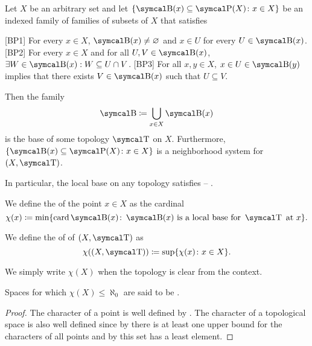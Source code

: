 \begin{proposition}\label{thm:topological_local_base_axioms}\cite[13]{Engelking1989}
  Let \( X \) be an arbitrary set and let \( \{ \CB(x) \subseteq \Power(X) \colon x \in X \} \) be an indexed family of families of subsets of \( X \) that satisfies
  \begin{description}
    [BP1] For every \( x \in X \), \( \CB(x) \neq \varnothing \) and \( x \in U \) for every \( U \in \CB(x) \).
    [BP2] For every \( x \in X \) and for all \( U, V \in \CB(x) \), \( \exists W \in \CB(x): W \subseteq U \cap V \).
    [BP3] For all \( x, y \in X \), \( x \in U \in \CB(y) \) implies that there exists \( V \in \CB(x) \) such that \( U \subseteq V \).
  \end{description}

  Then the family
  \begin{equation*}
    \CB \coloneqq \bigcup_{x \in X} \CB(x)
  \end{equation*}
  is the base of some topology \( \CT \) on \( X \). Furthermore, \( \{ \CB(x) \subseteq \Power(X) \colon x \in X \} \) is a neighborhood system for \( (X, \CT) \).

  In particular, the local base on any topology satisfies  -- .
\end{proposition}

\begin{definition}\label{def:topological_space_character}
  We define the  of the point \( x \in X \) as the cardinal
  \begin{equation*}
    \chi(x) \coloneqq \min \{ \Card \CB(x) \colon \CB(x) \text{ is a local base for } \CT \text{ at } x \}.
  \end{equation*}

  We define the  of of \( (X, \CT) \) as
  \begin{equation*}
    \chi((X, \CT)) \coloneqq \sup \{ \chi(x) \colon x \in X \}.
  \end{equation*}

  We simply write \( \chi(X) \) when the topology is clear from the context.

  Spaces for which \( \chi(X) \leq \aleph_0 \) are said to be .
\end{definition}
\begin{proof}
  The character of a point is well defined by . The character of a topological space is also well defined since by  there is at least one upper bound for the characters of all points and by  this set has a least element.
\end{proof}

